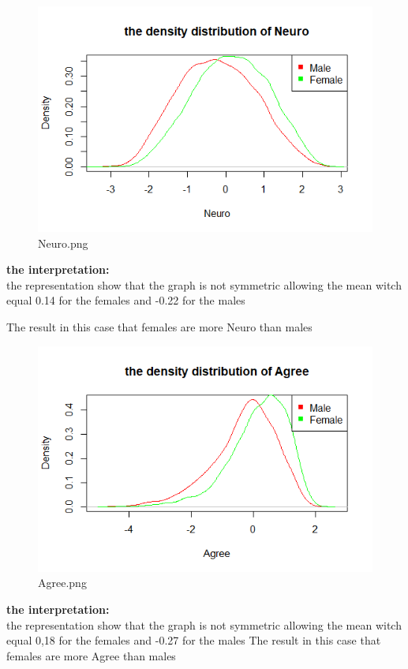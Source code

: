 \begin{figure}[]
\setlength{\abovecaptionskip}{-4pt}
\begin{center}
\includegraphics{Neuro.png}
  \caption{Neuro.png}
  \end{center}
\end{figure}
{\normalsize{\bf the interpretation:}} \\\vspace{0.5cm}
the representation show that the graph is not symmetric allowing 
the mean witch equal 0.14 for the females and -0.22 for the males 

The result in this case that females are more Neuro  than males


\begin{figure}[]
\setlength{\abovecaptionskip}{-4pt}
\begin{center}
\includegraphics{Agree.png}
  \caption{Agree.png}
  \end{center}
\end{figure}
{\normalsize{\bf the interpretation:}} \\\vspace{0.5cm}
the representation show that the graph is not symmetric allowing 
the mean witch equal 0,18 for the females and -0.27 for the males
The result in this case that females are more Agree  than males

